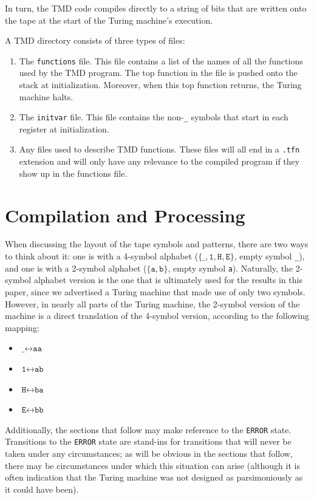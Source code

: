 \documentclass[11pt]{article}
\begin{document}
In turn, the TMD code compiles directly to a string of bits that are written onto the tape at the start of the Turing machine's execution.

A TMD directory consists of three types of files:

\begin{enumerate}
\item The \texttt{functions} file. This file contains a list of the names of all the functions used by the TMD program. The top function in the file is pushed onto the stack at initialization. Moreover, when this top function returns, the Turing machine halts.
\item The \texttt{initvar} file. This file contains the non-\texttt{\_} symbols that start in each register at initialization. 
\item Any files used to describe TMD functions. These files will all end in a \texttt{.tfn} extension and will only have any relevance to the compiled program if they show up in the functions file.
\end{enumerate}

\section{Compilation and Processing}

When discussing the layout of the tape symbols and patterns, there are two ways to think about it: one is with a 4-symbol alphabet ($\{\texttt{\_}, \texttt{1}, \texttt{H}, \texttt{E}\}$, empty symbol \texttt{\_}), and one is with a 2-symbol alphabet ($\{\texttt{a}, \texttt{b}\}$, empty symbol \texttt{a}). Naturally, the 2-symbol alphabet version is the one that is ultimately used for the results in this paper, since we advertised a Turing machine that made use of only two symbols. However, in nearly all parts of the Turing machine, the 2-symbol version of the machine is a direct translation of the 4-symbol version, according to the following mapping:

\begin{itemize}
\item $\texttt{\_} \leftrightarrow \texttt{aa}$
\item $\texttt{1} \leftrightarrow \texttt{ab}$
\item $\texttt{H} \leftrightarrow \texttt{ba}$
\item $\texttt{E} \leftrightarrow \texttt{bb}$
\end{itemize}

Additionally, the sections that follow may make reference to the \texttt{ERROR} state. Transitions to the \texttt{ERROR} state are stand-ins for transitions that will never be taken under any circumstances; as will be obvious in the sections that follow, there may be circumstances under which this situation can arise (although it is often indication that the Turing machine was not designed as parsimoniously as it could have been).
\end{document}
